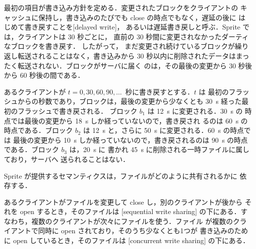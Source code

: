 \documentclass[../main.tex]{subfiles}
\begin{document}
最初の項目が書き込み方針を定める．変更されたブロックをクライアントの
キャッシュに保持し，書き込みのたびでも close の時点でもなく，遅延の後に
はじめて書き戻すことを[delayed write]，
あるいは遅延書き戻しと呼ぶ．Sprite では，クライアントは 30 秒ごとに，
直前の 30 秒間に変更されなかったダーティなブロックを書き戻す．
したがって，
まだ変更され続けているブロックが繰り返し転送されることはなく，書き込みから
30 秒以内に削除されたデータはまったく転送されない．ブロックがサーバに届く
のは，その最後の変更から 30 秒後から 60 秒後の間である．

\begin{example}
  あるクライアントが $t = 0, 30, 60, 90, \ldots$~秒に書き戻すとする．$t$ は
  最初のフラッシュからの秒数であり，ブロックは，最後の変更から少なくとも
  \SI{30}{\second} 経った最初のフラッシュで書き戻される．
  ブロック $b_1$ は \SI{12}{\second} に変更される．\SI{30}{\second} の
  時点では最後の変更から \SI{18}{\second} しか経っていないので，書き戻され
  るのは \SI{60}{\second} の時点である．ブロック $b_2$ は \SI{12}{\second}
  と，さらに \SI{50}{\second} に変更される．\SI{60}{\second} の時点では
  最後の変更から \SI{10}{\second} しか経っていないので，書き戻されるのは
  \SI{90}{\second} の時点である．ブロック $b_3$ は，\SI{20}{\second} に
  書かれ \SI{45}{\second} に削除される一時ファイルに属しており，サーバへ
  送られることはない．
\end{example}

Sprite が提供するセマンティクスは，ファイルがどのように共有されるかに
依存する．

\begin{definition}[逐次書き込み共有と並行書き込み共有]
  あるクライアントがファイルを変更して close し，別のクライアントが後から
  それを open するとき，そのファイルは
  [sequential write sharing]%
  の下にある．すなわち，複数のクライアントが次々にファイルを使う．ファイル
  が複数のクライアントで同時に open されており，そのうち少なくとも1つが
  書き込みのために open しているとき，そのファイルは
  [concurrent write sharing]%
  の下にある．
\end{definition}
\end{document}
